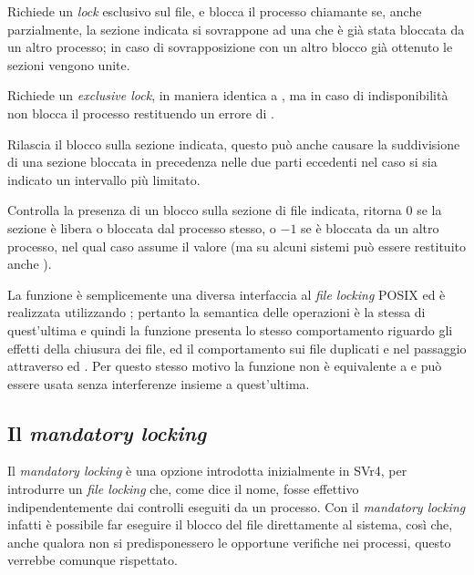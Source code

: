 \begin{basedescript}{\desclabelwidth{2.0cm}}
\item[\constd{F\_LOCK}] Richiede un \textit{lock} esclusivo sul file, e blocca
  il processo chiamante se, anche parzialmente, la sezione indicata si
  sovrappone ad una che è già stata bloccata da un altro processo; in caso di
  sovrapposizione con un altro blocco già ottenuto le sezioni vengono unite.
\item[\constd{F\_TLOCK}] Richiede un \textit{exclusive lock}, in maniera
  identica a , ma in caso di indisponibilità non blocca il
  processo restituendo un errore di .
\item[\constd{F\_ULOCK}] Rilascia il blocco sulla sezione indicata, questo può
  anche causare la suddivisione di una sezione bloccata in precedenza nelle
  due parti eccedenti nel caso si sia indicato un intervallo più limitato.
\item[\constd{F\_TEST}] Controlla la presenza di un blocco sulla sezione di
  file indicata,  ritorna $0$ se la sezione è libera o bloccata
  dal processo stesso, o $-1$ se è bloccata da un altro processo, nel qual
  caso  assume il valore  (ma su alcuni sistemi può
  essere restituito anche ).
\end{basedescript}

La funzione è semplicemente una diversa interfaccia al \textit{file locking}
POSIX ed è realizzata utilizzando ; pertanto la semantica delle
operazioni è la stessa di quest'ultima e quindi la funzione presenta lo stesso
comportamento riguardo gli effetti della chiusura dei file, ed il
comportamento sui file duplicati e nel passaggio attraverso  ed
. Per questo stesso motivo la funzione non è equivalente a
 e può essere usata senza interferenze insieme a quest'ultima.


\subsection{Il \textit{mandatory locking}}
\label{sec:file_mand_locking}


Il \textit{mandatory locking} è una opzione introdotta inizialmente in SVr4,
per introdurre un \textit{file locking} che, come dice il nome, fosse
effettivo indipendentemente dai controlli eseguiti da un processo. Con il
\textit{mandatory locking} infatti è possibile far eseguire il blocco del file
direttamente al sistema, così che, anche qualora non si predisponessero le
opportune verifiche nei processi, questo verrebbe comunque rispettato.

